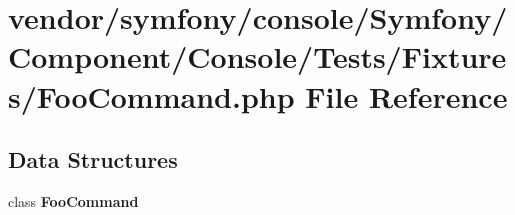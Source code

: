 \section{vendor/symfony/console/\+Symfony/\+Component/\+Console/\+Tests/\+Fixtures/\+Foo\+Command.php File Reference}
\label{console_2_symfony_2_component_2_console_2_tests_2_fixtures_2_foo_command_8php}
\subsection*{Data Structures}
\begin{DoxyCompactItemize}
\item 
class {\bf Foo\+Command}
\end{DoxyCompactItemize}
